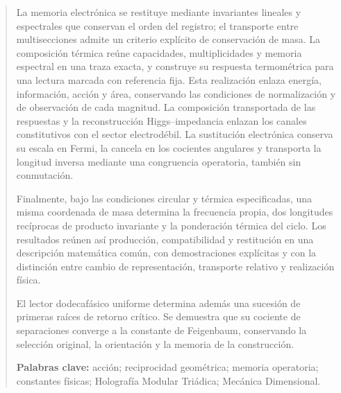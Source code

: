 \begin{abstract}
La memoria electrónica se restituye mediante invariantes lineales y
espectrales que conservan el orden del registro; el transporte entre
multisecciones admite un criterio explícito de conservación de masa.
La composición térmica reúne capacidades, multiplicidades y memoria
espectral en una traza exacta, y construye su respuesta termométrica
para una lectura marcada con referencia fija. Esta realización enlaza
energía, información, acción y área, conservando las condiciones de
normalización y de observación de cada magnitud.
La composición transportada de las respuestas y la reconstrucción
Higgs--impedancia enlazan los canales constitutivos con el sector
electrodébil. La sustitución electrónica conserva su escala en Fermi,
la cancela en los cocientes angulares y transporta la longitud inversa
mediante una congruencia operatoria, también sin conmutación.

Finalmente, bajo las
condiciones circular y térmica especificadas, una misma coordenada de masa
determina la frecuencia propia, dos longitudes recíprocas de producto
invariante y la ponderación térmica del ciclo. Los resultados reúnen así
producción, compatibilidad y restitución en una descripción matemática
común, con demostraciones explícitas y con la distinción entre cambio de
representación, transporte relativo y realización física.


El lector dodecafásico uniforme determina además una sucesión de primeras raíces de retorno crítico. Se demuestra que su cociente de separaciones converge a la constante de Feigenbaum, conservando la selección original, la orientación y la memoria de la construcción.



\par\smallskip\noindent\textbf{Palabras clave:} acción; reciprocidad geométrica; memoria operatoria; constantes físicas; Holografía Modular Triádica; Mecánica Dimensional.
\end{abstract}


\endgroup
